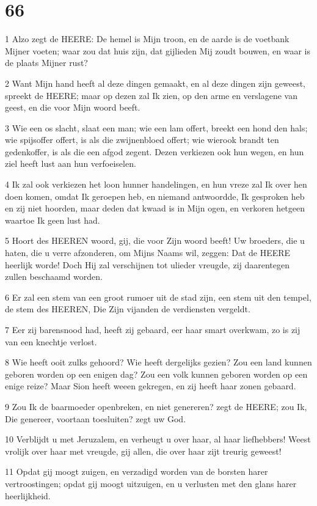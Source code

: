 \chapter{66}

\par 1 Alzo zegt de HEERE: De hemel is Mijn troon, en de aarde is de voetbank Mijner voeten; waar zou dat huis zijn, dat gijlieden Mij zoudt bouwen, en waar is de plaats Mijner rust?
\par 2 Want Mijn hand heeft al deze dingen gemaakt, en al deze dingen zijn geweest, spreekt de HEERE; maar op dezen zal Ik zien, op den arme en verslagene van geest, en die voor Mijn woord beeft.
\par 3 Wie een os slacht, slaat een man; wie een lam offert, breekt een hond den hals; wie spijsoffer offert, is als die zwijnenbloed offert; wie wierook brandt ten gedenkoffer, is als die een afgod zegent. Dezen verkiezen ook hun wegen, en hun ziel heeft lust aan hun verfoeiselen.
\par 4 Ik zal ook verkiezen het loon hunner handelingen, en hun vreze zal Ik over hen doen komen, omdat Ik geroepen heb, en niemand antwoordde, Ik gesproken heb en zij niet hoorden, maar deden dat kwaad is in Mijn ogen, en verkoren hetgeen waartoe Ik geen lust had.
\par 5 Hoort des HEEREN woord, gij, die voor Zijn woord beeft! Uw broeders, die u haten, die u verre afzonderen, om Mijns Naams wil, zeggen: Dat de HEERE heerlijk worde! Doch Hij zal verschijnen tot ulieder vreugde, zij daarentegen zullen beschaamd worden.
\par 6 Er zal een stem van een groot rumoer uit de stad zijn, een stem uit den tempel, de stem des HEEREN, Die Zijn vijanden de verdiensten vergeldt.
\par 7 Eer zij barensnood had, heeft zij gebaard, eer haar smart overkwam, zo is zij van een knechtje verlost.
\par 8 Wie heeft ooit zulks gehoord? Wie heeft dergelijks gezien? Zou een land kunnen geboren worden op een enigen dag? Zou een volk kunnen geboren worden op een enige reize? Maar Sion heeft weeen gekregen, en zij heeft haar zonen gebaard.
\par 9 Zou Ik de baarmoeder openbreken, en niet genereren? zegt de HEERE; zou Ik, Die genereer, voortaan toesluiten? zegt uw God.
\par 10 Verblijdt u met Jeruzalem, en verheugt u over haar, al haar liefhebbers! Weest vrolijk over haar met vreugde, gij allen, die over haar zijt treurig geweest!
\par 11 Opdat gij moogt zuigen, en verzadigd worden van de borsten harer vertroostingen; opdat gij moogt uitzuigen, en u verlusten met den glans harer heerlijkheid.
